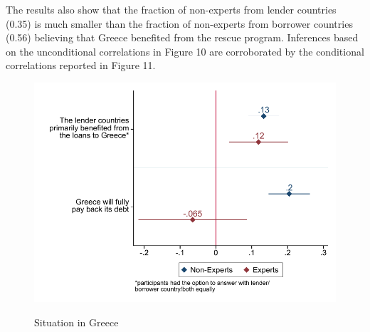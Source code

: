  \clearpage
 The results also show that the fraction of non-experts from lender countries (0.35) is much smaller than the fraction of non-experts from borrower countries (0.56) believing that Greece benefited from the rescue program. Inferences based on the unconditional correlations in Figure 10 are corroborated by the conditional correlations reported in Figure 11.
 \\
\begin{figure}[h!] 
\begin{center}
     \caption{Situation in Greece}
     \includegraphics[scale=0.8]{Question6_7_base.pdf}
     \label{fig:my_label}
     \end{center}
     \tiny
\end{figure}
